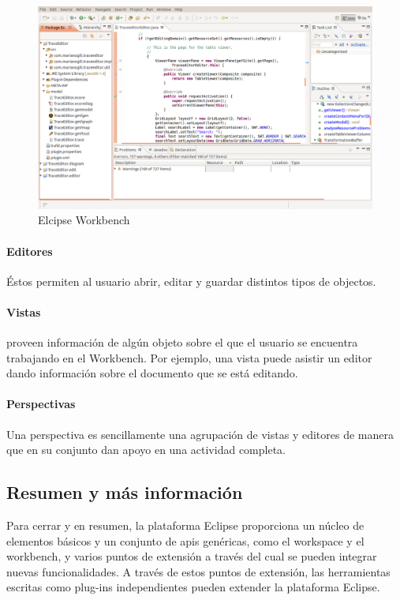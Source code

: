 \documentclass[a4paper,12pt,oneside,spanish]{book}
\begin{document}
\begin{figure}[hbtp]
\centering
\includegraphics[scale=0.3]{./img/EclipseWorkbench}
\caption{Elcipse Workbench}
\label{fig:EclipseWorkbench}
\end{figure}

\paragraph{Editores} Éstos permiten al usuario abrir, editar y guardar distintos tipos de objectos.

\paragraph{Vistas} proveen información de algún objeto sobre el que el usuario se encuentra trabajando en el Workbench. Por ejemplo, una vista puede asistir un editor dando información sobre el documento que se está editando.

\paragraph{Perspectivas} Una perspectiva es sencillamente una agrupación de vistas y editores de manera que en su conjunto dan apoyo en una actividad completa.


\subsection{Resumen y más información}

Para cerrar y en resumen, la plataforma Eclipse proporciona un núcleo de elementos básicos y un conjunto de \glspl{api} genéricas, como el workspace y el workbench, y varios puntos de extensión a través del cual se pueden integrar nuevas funcionalidades. A través de estos puntos de extensión, las herramientas escritas como plug-ins independientes pueden extender la plataforma Eclipse.
\end{document}
